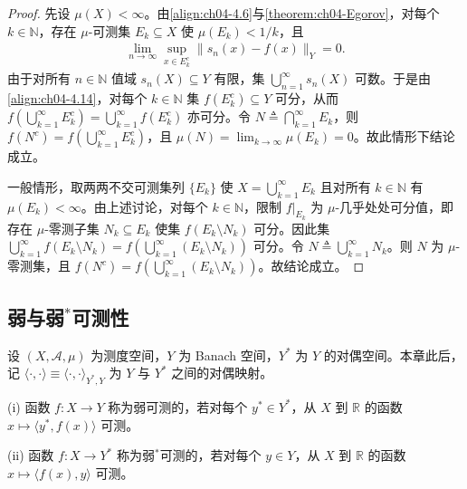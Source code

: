 \documentclass[../../main.tex]{subfiles}%
\begin{document}
\begin{proof}
先设 $\mu(X)<\infty$。由\eqref{align:ch04-4.6}与\cref{theorem:ch04-Egorov}，对每个 $k\in\mathbb{N}$，存在 $\mu$-可测集 $E_k\subseteq X$ 使 $\mu(E_k)<1/k$，且
\begin{align}
\lim_{n\to\infty}\sup_{x\in E_k^c}\|s_n(x)-f(x)\|_Y=0. \label{align:ch04-4.14}
\end{align}
由于对所有 $n\in\mathbb{N}$ 值域 $s_n(X)\subseteq Y$ 有限，集 $\bigcup_{n=1}^\infty s_n(X)$ 可数。于是由\eqref{align:ch04-4.14}，对每个 $k\in\mathbb{N}$ 集 $f(E_k^c)\subseteq Y$ 可分，从而 $f(\bigcup_{k=1}^\infty E_k^c)=\bigcup_{k=1}^\infty f(E_k^c)$ 亦可分。令 $N\triangleq \bigcap_{k=1}^\infty E_k$，则 $f(N^c)=f(\bigcup_{k=1}^\infty E_k^c)$，且 $\mu(N)=\lim_{k\to\infty}\mu(E_k)=0$。故此情形下结论成立。

一般情形，取两两不交可测集列 $\{E_k\}$ 使 $X=\bigcup_{k=1}^\infty E_k$ 且对所有 $k\in\mathbb{N}$ 有 $\mu(E_k)<\infty$。由上述讨论，对每个 $k\in\mathbb{N}$，限制 $f|_{E_k}$ 为 $\mu$-几乎处处可分值，即存在 $\mu$-零测子集 $N_k\subseteq E_k$ 使集 $f(E_k\setminus N_k)$ 可分。因此集 $\bigcup_{k=1}^\infty f(E_k\setminus N_k)=f(\bigcup_{k=1}^\infty(E_k\setminus N_k))$ 可分。令 $N\triangleq \bigcup_{k=1}^\infty N_k$。则 $N$ 为 $\mu$-零测集，且 $f(N^c)=f(\bigcup_{k=1}^\infty(E_k\setminus N_k))$。故结论成立。
\end{proof}

\subsection{弱与弱$^*$可测性}\label{subsection:ch04-弱可测性}

设 $(X,\mathcal{A},\mu)$ 为测度空间，$Y$ 为 Banach 空间，$Y^*$ 为 $Y$ 的对偶空间。本章此后，记 $\langle\cdot,\cdot\rangle\equiv\langle\cdot,\cdot\rangle_{Y^*,Y}$ 为 $Y$ 与 $Y^*$ 之间的对偶映射。

\begin{definition}[弱、弱$^*$可测性]\label{definition:ch04-弱可测}\label{definition:ch04-弱星可测}
(i) 函数 $f:X\to Y$ 称为弱可测的，若对每个 $y^*\in Y^*$，从 $X$ 到 $\mathbb{R}$ 的函数 $x\mapsto\langle y^*,f(x)\rangle$ 可测。

(ii) 函数 $f:X\to Y^*$ 称为弱$^*$可测的，若对每个 $y\in Y$，从 $X$ 到 $\mathbb{R}$ 的函数 $x\mapsto\langle f(x),y\rangle$ 可测。
\end{definition}
\end{document}
